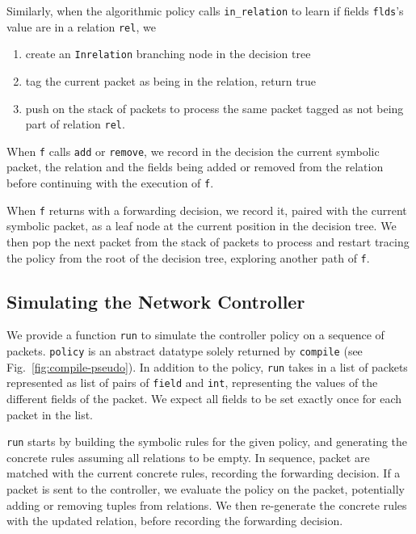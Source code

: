 \documentclass[preprint]{sigplanconf}
\begin{document}
Similarly, when the algorithmic policy calls \lstinline|in_relation| to learn if fields \lstinline|flds|'s value are in a relation \lstinline|rel|, we
\begin{enumerate}
  \item create an \lstinline|Inrelation| branching node in the decision tree
  \item tag the current packet as being in the relation, return true
  \item push on the stack of packets to process the same packet tagged as not being part of relation \lstinline|rel|.
\end{enumerate}
When \lstinline|f| calls \lstinline|add| or \lstinline|remove|, we record in the decision the current symbolic packet, the relation and the fields being added or removed from the relation before continuing with the execution of \lstinline|f|.





When \lstinline|f| returns with a forwarding decision, we record it, paired with the current symbolic packet, as a leaf node at the current position in the decision tree. We then pop the next packet from the stack of packets to process and restart tracing the policy from the root of the decision tree, exploring another path of \lstinline|f|.  


\subsection*{Simulating the Network Controller}

We provide a function \lstinline|run| to simulate the controller policy on a sequence of packets. \lstinline|policy| is an abstract datatype solely returned by \lstinline|compile| (see Fig.~\ref{fig:compile-pseudo}). In addition to the policy, \lstinline|run| takes in a list of packets represented as list of pairs of \lstinline|field| and \lstinline|int|, representing the values of the different fields of the packet. We expect all fields to be set exactly once for each packet in the list.

\lstinline|run| starts by building the symbolic rules for the given policy, and generating the concrete rules assuming all relations to be empty. In sequence, packet are matched with the current concrete rules, recording the forwarding decision. If a packet is sent to the controller, we evaluate the policy on the packet, potentially adding or removing tuples from relations. We then re-generate the concrete rules with the updated relation, before recording the forwarding decision.
\end{document}
